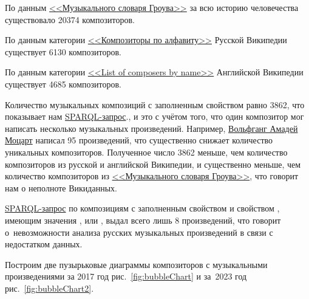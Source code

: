 По данным \href{https://ru.wikipedia.org/wiki/Музыкальный_словарь_Гроува}{<<Музыкального словаря Гроува>>} за всю историю человечества существовало \num{20374} композиторов.


По данным категории \href{https://ru.wikipedia.org/wiki/Категория:Композиторы_по_алфавиту}{<<Композиторы по алфавиту>>} Русской Википедии существует \num{6130} композиторов.


По данным категории \href{https://en.wikipedia.org/wiki/List_of_composers_by_name}{<<List of composers by name>>} Английской Википедии существует \num{4685} композиторов.


Количество музыкальных композиций с заполненным свойством  равно \num{3862}, {что показывает нам \href{https://w.wiki/56Rc}{SPARQL-запрос}.}, и это с учётом того, что один композитор мог написать несколько музыкальных произведений. Например, \href{https://ru.wikipedia.org/wiki/Моцарт,_Вольфганг_Амадей}{Вольфганг Амадей Моцарт} написал \num{95} произведений, что существенно снижает количество уникальных композиторов. Полученное число \num{3862} меньше, чем количество композиторов из русской и английской Википедии, и существенно меньше, чем количество композиторов из \href{https://ru.wikipedia.org/wiki/Музыкальный_словарь_Гроува}{<<Музыкального словаря Гроува>>}, что говорит нам о неполноте Викиданных.

\href{https://w.wiki/56Rj}{SPARQL-запрос} по композициям с заполненным свойством  и свойством , имеющим значения ,  или , выдал всего лишь \num{8} произведений, что говорит о~невозможности анализа русских музыкальных произведений в связи с недостатком данных.

Построим  две пузырьковые диаграммы композиторов с музыкальными произведениями за 2017 год рис.~\ref{fig:bubbleChart} и за~2023 год рис.~\ref{fig:bubbleChart2}.

